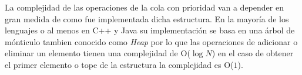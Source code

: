 La complejidad de las operaciones de la cola con prioridad van a depender en gran medida de como fue implementada dicha estructura. En la mayoría de los lenguajes o al menos en C++ y Java su implementación se basa en una árbol de mónticulo tambien conocido como \emph{Heap} por lo que las operaciones de adicionar o eliminar un elemento tienen una complejidad de O($\log N$) en el caso de obtener el primer elemento o tope de la estructura la complejidad es O($1$).